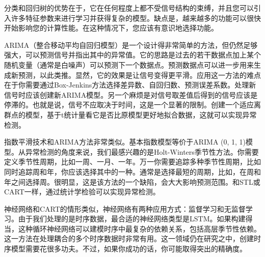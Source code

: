 \documentclass[UTF8]{ctexart}
\begin{document}
        分类和回归树的优势在于，它在任何程度上都不受信号结构的束缚，并且您可以引入许多特征参数来进行学习并获得复杂的模型。缺点是，越来越多的功能可以很快开始影响您的计算性能。在这种情况下，您应该有意识地选择功能。

        ARIMA（整合移动平均自回归模型）是一个设计得非常简单的方法，但仍然足够强大，可以预测信号并指出其中的异常值。它的思路是过去的若干数据点加上某个随机变量（通常是白噪声）可以预测下一个数据点。预测数据点可以进一步用来生成新预测，以此类推。显然，它的效果是让信号变得更平滑。应用这一方法的难点在于你需要通过Box-Jenkins方法选择差异数、自回归数、预测误差系数。处理新信号时应该创建新ARIMA模型。另一个麻烦是对信号取差值后得到的信号应该是停滞的。也就是说，信号不应取决于时间，这是一个显著的限制。创建一个适应离群点的模型，基于t统计量看它是否比原模型更好地拟合数据，这就可以实现异常检测。

        指数平滑技术和ARIMA方法非常类似。基本指数模型等价于ARIMA (0, 1, 1)模型。从异常检测的角度来说，我们最感兴趣的是Holt-Winters季节性方法。你需要定义季节性周期，比如一周、一月、一年。万一你需要追踪多种季节性周期，比如同时追踪周和年，你应该选择其中的一种。通常是选择最短的周期，比如，在周和年之间选择周。很明显，这是该方法的一个缺陷，会大大影响预测范围。和STL或CART一样，通过统计学检验可以实现异常检测。

        神经网络和CART的情形类似，神经网络有两种应用方式：监督学习和无监督学习。由于我们处理的是时序数据，最合适的神经网络类型是LSTM。如果构建得当，这种循环神经网络可以建模时序中最复杂的依赖关系，包括高层季节性依赖。这一方法在处理耦合的多个时序数据时非常有用。这一领域仍在研究之中，创建时序模型需要花很多功夫。不过，如果你成功的话，你可能取得突出的精确度。\cite{link11}




\end{document}
